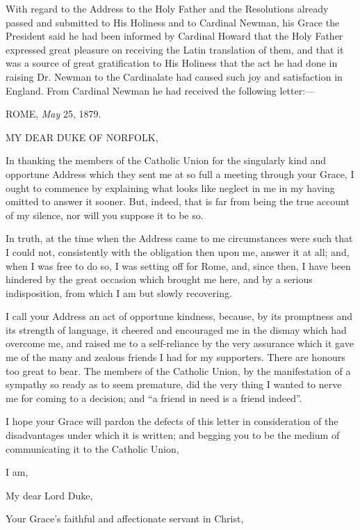 With regard to the Address to the Holy Father and the Resolutions
already passed and submitted to His Holiness and to Cardinal
Newman, his Grace the President said he had been
informed by Cardinal Howard that the Holy Father expressed great
pleasure on receiving the Latin translation of them, and that it was a
source of great gratification to His Holiness that the act he had done
in raising Dr. Newman to the Cardinalate had caused such joy and
satisfaction in England. From Cardinal Newman he had received the
following letter:—


ROME, \emph{May} 25, 1879.

MY DEAR DUKE
OF NORFOLK,

In thanking the members of the Catholic Union for the singularly kind
and opportune Address which they sent me at so full a meeting through
your Grace, I ought to commence by explaining what looks like neglect
in me in my having omitted to answer it sooner. But, indeed, that is
far from being the true account of my silence, nor will you suppose it
to be so.

In truth, at the time when the Address came to me circumstances
were such that I could not, consistently with the obligation then upon
me, answer it at all; and, when I was free to do so, I was setting off
for Rome, and, since then, I have been hindered by the great
occasion which brought me here, and by a serious indisposition, from
which I am but slowly recovering.

I call your Address an act of opportune kindness, because, by its
promptness and its strength of language, it cheered and encouraged me
in the dismay which had overcome me, and raised me to a self-reliance
by the very assurance which it gave me of the many and zealous friends
I had for my supporters. There are honours too great to bear. The
members of the Catholic Union, by the manifestation of a sympathy so
ready as to seem premature, did the very thing I wanted to nerve me
for coming to a decision; and ``a friend in need is a friend
indeed''.

I hope your Grace will pardon the defects of this letter in
consideration of the disadvantages under which it is written; and
begging you to be the medium of communicating it to the Catholic
Union,

I am,

My dear Lord Duke,

Your Grace's faithful and affectionate servant in Christ,

